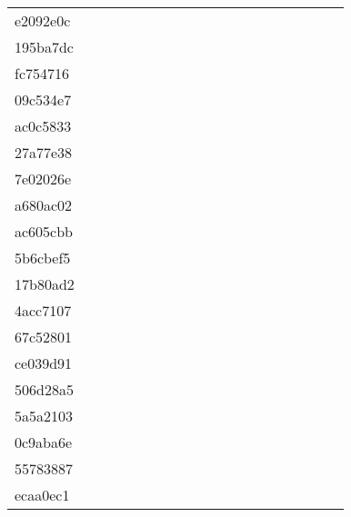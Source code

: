 \begin{table*}[htb]
\begin{tabular}{l|cccccccccccccccccc}
e2092e0c  & \C & \X & \X & \X & \X & \X & \X & \X & \X & \X & \X & \X & \X & \C & \C & \X & \X \\
195ba7dc  & \C & \X & \X & \X & \X & \X & \X & \C & \C & \X & \C & \C & \C & \C & \C & \C & \C \\
fc754716  & \C & \X & \C & \X & \C & \C & \C & \C & \C & \C & \C & \C & \C & \C & \C & \C & \C \\
09c534e7  & \X & \X & \X & \X & \X & \X & \X & \X & \X & \X & \X & \X & \X & \X & \X & \X & \X \\
ac0c5833  & \X & \X & \X & \X & \X & \X & \X & \X & \X & \X & \X & \X & \X & \X & \X & \X & \X \\
27a77e38  & \C & \X & \C & \X & \X & \X & \X & \X & \X & \X & \X & \X & \X & \C & \C & \X & \X \\
7e02026e  & \C & \X & \X & \X & \X & \X & \X & \X & \X & \X & \X & \C & \X & \C & \C & \X & \X \\
a680ac02  & \C & \X & \X & \X & \X & \X & \X & \X & \X & \X & \X & \X & \X & \C & \C & \C & \C \\
ac605cbb  & \C & \X & \X & \X & \X & \X & \X & \X & \X & \X & \X & \X & \X & \C & \C & \X & \X \\
5b6cbef5  & \C & \X & \C & \X & \X & \X & \X & \X & \X & \X & \C & \C & \C & \C & \C & \C & \X \\
17b80ad2  & \C & \X & \X & \X & \X & \X & \X & \X & \X & \X & \X & \X & \X & \C & \C & \C & \X \\
4acc7107  & \C & \X & \X & \X & \X & \X & \X & \X & \X & \X & \X & \X & \X & \C & \C & \X & \X \\
67c52801  & \C & \X & \X & \X & \X & \X & \X & \X & \X & \X & \X & \X & \X & \C & \C & \X & \X \\
ce039d91  & \C & \X & \X & \X & \X & \X & \X & \X & \X & \X & \X & \X & \X & \X & \C & \X & \X \\
506d28a5  & \C & \X & \C & \X & \X & \X & \X & \X & \C & \C & \C & \C & \C & \C & \C & \C & \C \\
5a5a2103  & \C & \X & \X & \X & \X & \X & \X & \X & \X & \X & \X & \X & \X & \C & \C & \C & \C \\
0c9aba6e  & \C & \X & \X & \X & \X & \X & \X & \C & \C & \C & \X & \C & \C & \C & \C & \C & \C \\
55783887  & \C & \X & \X & \X & \X & \X & \X & \X & \X & \X & \X & \X & \X & \C & \C & \X & \X \\
ecaa0ec1  & \C & \X & \X & \X & \X & \X & \X & \X & \X & \X & \X & \X & \C & \C & \C & \X & \X \\

\end{tabular}
\end{table*}
